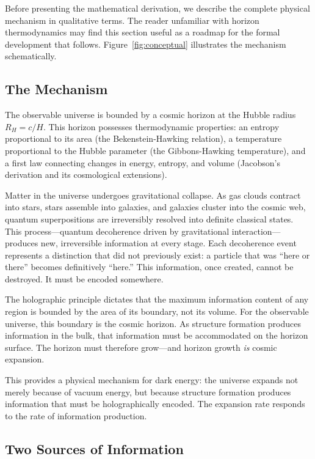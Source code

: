 \documentclass[twocolumn,superscriptaddress,prl,amsmath,amssymb]{revtex4-2}
\begin{document}
Before presenting the mathematical derivation, we describe the complete physical mechanism in qualitative terms. The reader unfamiliar with horizon thermodynamics may find this section useful as a roadmap for the formal development that follows. Figure~\ref{fig:conceptual} illustrates the mechanism schematically.

\subsection{The Mechanism}

The observable universe is bounded by a cosmic horizon at the Hubble radius $R_H = c/H$. This horizon possesses thermodynamic properties: an entropy proportional to its area (the Bekenstein-Hawking relation), a temperature proportional to the Hubble parameter (the Gibbons-Hawking temperature), and a first law connecting changes in energy, entropy, and volume (Jacobson's derivation and its cosmological extensions).

Matter in the universe undergoes gravitational collapse. As gas clouds contract into stars, stars assemble into galaxies, and galaxies cluster into the cosmic web, quantum superpositions are irreversibly resolved into definite classical states. This process---quantum decoherence driven by gravitational interaction---produces new, irreversible information at every stage. Each decoherence event represents a distinction that did not previously exist: a particle that was ``here or there'' becomes definitively ``here.'' This information, once created, cannot be destroyed. It must be encoded somewhere.

The holographic principle dictates that the maximum information content of any region is bounded by the area of its boundary, not its volume. For the observable universe, this boundary is the cosmic horizon. As structure formation produces information in the bulk, that information must be accommodated on the horizon surface. The horizon must therefore grow---and horizon growth \textit{is} cosmic expansion.

This provides a physical mechanism for dark energy: the universe expands not merely because of vacuum energy, but because structure formation produces information that must be holographically encoded. The expansion rate responds to the rate of information production.

\subsection{Two Sources of Information}
\end{document}
